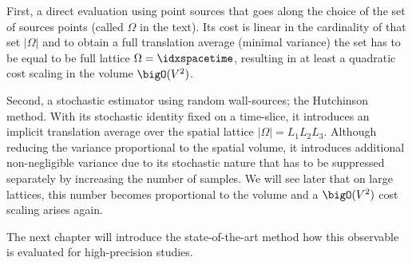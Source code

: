 First, a direct evaluation using point sources that goes along the choice of the set of sources points (called $\Omega$ in the text).
Its cost is linear in the cardinality of that set $\lvert \Omega \rvert$ and to obtain a full translation average (\ie minimal variance) the set has to be equal to be full lattice $\Omega = \idxspacetime$, resulting in at least a quadratic cost scaling in the volume $\bigO(V^{2})$.

Second, a stochastic estimator using random wall-sources; the Hutchinson method.
With its stochastic identity fixed on a time-slice, it introduces an implicit translation average over the spatial lattice $\lvert \Omega \rvert = L_1 L_2 L_3$.
Although reducing the variance proportional to the spatial volume, it introduces additional non-negligible variance due to its stochastic nature that has to be suppressed separately by increasing the number of samples.
We will see later that on large lattices, this number becomes proportional to the volume and a $\bigO(V^{2})$ cost scaling arises again.

The next chapter will introduce the state-of-the-art method how this observable is evaluated for high-precision studies.

